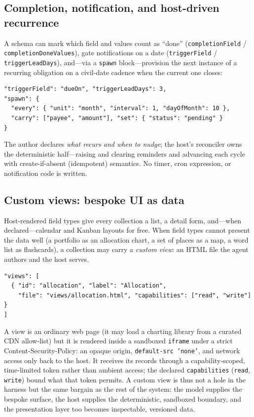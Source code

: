 \documentclass[11pt]{article}
\newcommand{\code}[1]{\texttt{\small #1}}
\begin{document}
\subsection{Completion, notification, and host-driven recurrence}
A schema can mark which field and values count as ``done''
(\code{completionField} / \code{completionDoneValues}), gate notifications on a
date (\code{triggerField} / \code{triggerLeadDays}), and---via a \code{spawn}
block---provision the next instance of a recurring obligation on a civil-date
cadence when the current one closes:
\begin{lstlisting}
"triggerField": "dueOn", "triggerLeadDays": 3,
"spawn": {
  "every": { "unit": "month", "interval": 1, "dayOfMonth": 10 },
  "carry": ["payee", "amount"], "set": { "status": "pending" }
}
\end{lstlisting}
The author declares \emph{what recurs and when to nudge}; the host's reconciler
owns the deterministic half---raising and clearing reminders and advancing each
cycle with create-if-absent (idempotent) semantics. No timer, cron expression, or
notification code is written.

\subsection{Custom views: bespoke UI as data}
Host-rendered field types give every collection a list, a detail form, and---when
declared---calendar and Kanban layouts for free. When field types cannot present
the data well (a portfolio as an allocation chart, a set of places as a map, a
word list as flashcards), a collection may carry a \emph{custom view}: an HTML
file the agent authors and the host serves.
\begin{lstlisting}
"views": [
  { "id": "allocation", "label": "Allocation",
    "file": "views/allocation.html", "capabilities": ["read", "write"] }
]
\end{lstlisting}
A view is an ordinary web page (it may load a charting library from a curated CDN
allow-list) but it is rendered inside a sandboxed \code{iframe} under a strict
Content-Security-Policy: an opaque origin, \code{default-src 'none'}, and network
access only back to the host. It receives its records through a capability-scoped,
time-limited token rather than ambient access; the declared \code{capabilities}
(\code{read}, \code{write}) bound what that token permits. A custom view is thus
not a hole in the harness but the same bargain as the rest of the system: the
model supplies the bespoke surface, the host supplies the deterministic, sandboxed
boundary, and the presentation layer too becomes inspectable, versioned data.
\end{document}
